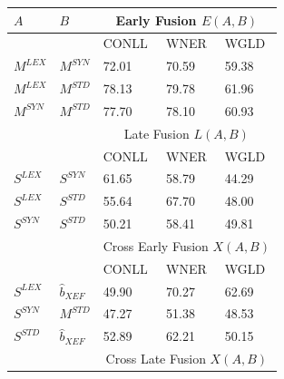 \documentclass{llncs}
\begin{document}
\begin{table}[h]
\centering
\label{my-label}
\begin{tabular}{@{}lllll@{}}
\toprule
    $A$      &    $B$       & \multicolumn{3}{c}{Early Fusion $E(A,B)$}                                            \\ \midrule
          &           & CONLL                      & WNER                      & WGLD                      \\ \cmidrule{3-5}
$M^{LEX}$ & $M^{SYN}$ & 72.01                      & 70.59                     & 59.38                     \\
$M^{LEX}$ & $M^{STD}$ & 78.13                      & 79.78                     & 61.96                     \\
$M^{SYN}$ & $M^{STD}$ & 77.70                      & 78.10                     & 60.93                     \\
\midrule
          &           & \multicolumn{3}{c}{Late Fusion $L(A,B)$}                                             \\
\midrule     
          &           & CONLL                      & WNER                      & WGLD                      \\ \cmidrule{3-5}
$S^{LEX}$ & $S^{SYN}$ & 61.65                      & 58.79                     & 44.29                     \\
$S^{LEX}$ & $S^{STD}$ & 55.64                      & 67.70                     & 48.00                     \\
$S^{SYN}$ & $S^{STD}$ & 50.21                      & 58.41                     & 49.81                     \\
\midrule
          &           & \multicolumn{3}{c}{Cross Early Fusion $X(A,B)$} \\
\midrule
          &           & CONLL                      & WNER                      & WGLD                      \\ \cmidrule{3-5}
$S^{LEX}$ & $\hat{b}_{\scriptscriptstyle XEF}$        & 49.90                      & 70.27                     & 62.69                     \\
$S^{SYN}$ & $M^{STD}$ & 47.27                      & 51.38                     & 48.53                     \\
$S^{STD}$ & $\hat{b}_{\scriptscriptstyle XEF}$        & 52.89                      & 62.21                     & 50.15                     \\
\midrule
          &           & \multicolumn{3}{c}{Cross Late Fusion $X(A,B)$}  \\

\end{tabular}
\end{table}
\end{document}
